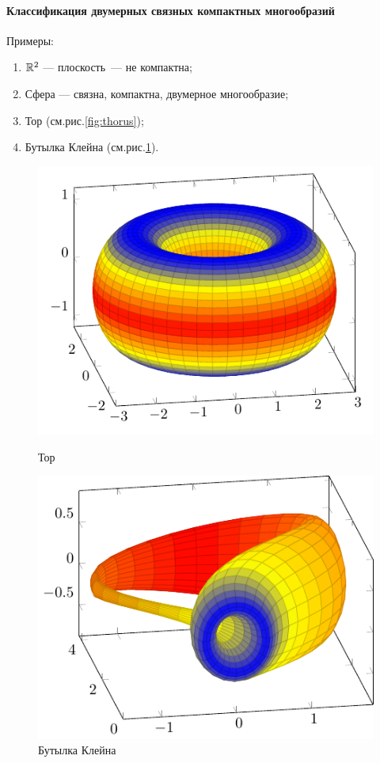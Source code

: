\paragraph{Классификация двумерных связных компактных многообразий}
Примеры:
\begin{enumerate}
    \item $\mathbb{R}^2$ — плоскость — не компактна;
    \item Сфера — связна, компактна, двумерное многообразие;
    \item Тор (см.рис.\ref{fig:thorus});
    \item Бутылка Клейна (см.рис.\ref{fig:kleyn}).
\end{enumerate}

\begin{figure}[h]
    \centering
    \includegraphics[scale=0.8]{images/c9.2.pdf}
    \caption{Тор}
    \label{fig:thorus}
    \includegraphics[scale=0.8]{images/c9.1.pdf}
    \caption{Бутылка Клейна}
    \label{fig:kleyn}
\end{figure}

